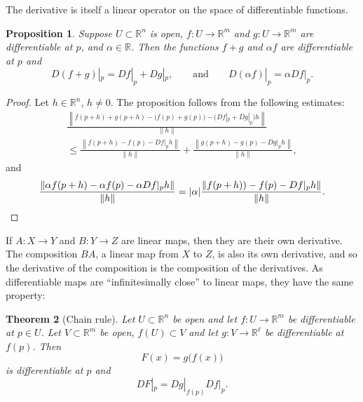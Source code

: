 \documentclass[12pt,openany]{book}
\newcommand{\sabs}[1]{\lvert {#1} \rvert}
\newcommand{\snorm}[1]{\lVert {#1} \rVert}
\newcommand{\norm}[1]{\left\lVert {#1} \right\rVert}
\newcommand{\R}{{\mathbb{R}}}
\theoremstyle{plain}
\newtheorem{thm}{Theorem}[section]
\newtheorem{prop}[thm]{Proposition}
\theoremstyle{remark}
\theoremstyle{definition}
\theoremstyle{exercise}
\theoremstyle{example}
\begin{document}
The derivative is itself a linear operator on the space of differentiable
functions.

\begin{prop}
Suppose $U \subset \R^n$ is open,
$f \colon U \to \R^m$ and
$g \colon U \to \R^m$ are differentiable at $p$,
and $\alpha \in \R$.  Then the functions $f+g$ and $\alpha f$
are differentiable at $p$ and
\begin{equation*}
D(f+g)|_p = Df|_p + Dg|_p , \qquad \text{and} \qquad D(\alpha f)|_p = \alpha
Df|_p .
\end{equation*}
\end{prop}

\begin{proof}
Let $h \in \R^n$, $h \not= 0$.  The proposition follows from the following
estimates:
\begin{multline*}
\frac{\norm{f(p+h)+g(p+h)-\bigl(f(p)+g(p)\bigr) - \bigl(Df|_p + Dg|_p\bigr)h}}{\snorm{h}}
\\
\leq
\frac{\norm{f(p+h)-f(p) - Df|_ph}}{\snorm{h}}
+
\frac{\norm{g(p+h)-g(p) - Dg|_ph}}{\snorm{h}} ,
\end{multline*}
and
\begin{equation*}
\frac{\norm{\alpha f(p+h) - \alpha f(p) - \alpha Df|_p h}}{\snorm{h}}
=
\sabs{\alpha} \frac{\norm{f(p+h))-f(p) - Df|_ph}}{\snorm{h}} .
\qedhere
\end{equation*}
\end{proof}

If $A \colon X \to Y$ and $B \colon Y \to Z$ are linear maps, then 
they are their own derivative.  The composition
$BA$, a linear map from $X$ to $Z$, is also its own derivative, and
so the derivative of the composition is the composition
of the derivatives.  As differentiable maps are ``infinitesimally close''
to linear maps, they have the same property:

\begin{thm}[Chain rule] \label{thm:realchain}
Let $U \subset \R^n$ be open and let $f \colon U \to \R^m$ be
differentiable at $p \in U$.  Let $V \subset \R^m$ be open,
$f(U) \subset V$ and let $g \colon V \to \R^\ell$ be differentiable
at $f(p)$.  Then
\begin{equation*}
F(x) = g\bigl(f(x)\bigr)
\end{equation*}
is differentiable at $p$ and
\begin{equation*}
DF|_p = Dg|_{f(p)} Df|_p .
\end{equation*}
\end{thm}
\end{document}
